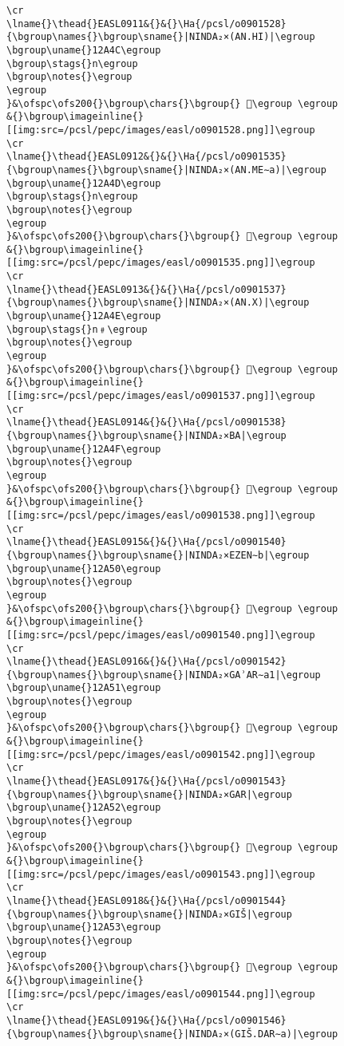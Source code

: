 \begin{verbatim}
\cr
\lname{}\thead{}EASL0911&{}&{}\Ha{/pcsl/o0901528}{\bgroup\names{}\bgroup\sname{}|NINDA₂×(AN.HI)|\egroup
\bgroup\uname{}12A4C\egroup
\bgroup\stags{}n\egroup
\bgroup\notes{}\egroup
\egroup
}&\ofspc\ofs200{}\bgroup\chars{}\bgroup{} 𒩌\egroup \egroup
&{}\bgroup\imageinline{}[[img:src=/pcsl/pepc/images/easl/o0901528.png]]\egroup
\cr
\lname{}\thead{}EASL0912&{}&{}\Ha{/pcsl/o0901535}{\bgroup\names{}\bgroup\sname{}|NINDA₂×(AN.ME∼a)|\egroup
\bgroup\uname{}12A4D\egroup
\bgroup\stags{}n\egroup
\bgroup\notes{}\egroup
\egroup
}&\ofspc\ofs200{}\bgroup\chars{}\bgroup{} 𒩍\egroup \egroup
&{}\bgroup\imageinline{}[[img:src=/pcsl/pepc/images/easl/o0901535.png]]\egroup
\cr
\lname{}\thead{}EASL0913&{}&{}\Ha{/pcsl/o0901537}{\bgroup\names{}\bgroup\sname{}|NINDA₂×(AN.X)|\egroup
\bgroup\uname{}12A4E\egroup
\bgroup\stags{}n﹟\egroup
\bgroup\notes{}\egroup
\egroup
}&\ofspc\ofs200{}\bgroup\chars{}\bgroup{} 𒩎\egroup \egroup
&{}\bgroup\imageinline{}[[img:src=/pcsl/pepc/images/easl/o0901537.png]]\egroup
\cr
\lname{}\thead{}EASL0914&{}&{}\Ha{/pcsl/o0901538}{\bgroup\names{}\bgroup\sname{}|NINDA₂×BA|\egroup
\bgroup\uname{}12A4F\egroup
\bgroup\notes{}\egroup
\egroup
}&\ofspc\ofs200{}\bgroup\chars{}\bgroup{} 𒩏\egroup \egroup
&{}\bgroup\imageinline{}[[img:src=/pcsl/pepc/images/easl/o0901538.png]]\egroup
\cr
\lname{}\thead{}EASL0915&{}&{}\Ha{/pcsl/o0901540}{\bgroup\names{}\bgroup\sname{}|NINDA₂×EZEN∼b|\egroup
\bgroup\uname{}12A50\egroup
\bgroup\notes{}\egroup
\egroup
}&\ofspc\ofs200{}\bgroup\chars{}\bgroup{} 𒩐\egroup \egroup
&{}\bgroup\imageinline{}[[img:src=/pcsl/pepc/images/easl/o0901540.png]]\egroup
\cr
\lname{}\thead{}EASL0916&{}&{}\Ha{/pcsl/o0901542}{\bgroup\names{}\bgroup\sname{}|NINDA₂×GAʾAR∼a1|\egroup
\bgroup\uname{}12A51\egroup
\bgroup\notes{}\egroup
\egroup
}&\ofspc\ofs200{}\bgroup\chars{}\bgroup{} 𒩑\egroup \egroup
&{}\bgroup\imageinline{}[[img:src=/pcsl/pepc/images/easl/o0901542.png]]\egroup
\cr
\lname{}\thead{}EASL0917&{}&{}\Ha{/pcsl/o0901543}{\bgroup\names{}\bgroup\sname{}|NINDA₂×GAR|\egroup
\bgroup\uname{}12A52\egroup
\bgroup\notes{}\egroup
\egroup
}&\ofspc\ofs200{}\bgroup\chars{}\bgroup{} 𒩒\egroup \egroup
&{}\bgroup\imageinline{}[[img:src=/pcsl/pepc/images/easl/o0901543.png]]\egroup
\cr
\lname{}\thead{}EASL0918&{}&{}\Ha{/pcsl/o0901544}{\bgroup\names{}\bgroup\sname{}|NINDA₂×GIŠ|\egroup
\bgroup\uname{}12A53\egroup
\bgroup\notes{}\egroup
\egroup
}&\ofspc\ofs200{}\bgroup\chars{}\bgroup{} 𒩓\egroup \egroup
&{}\bgroup\imageinline{}[[img:src=/pcsl/pepc/images/easl/o0901544.png]]\egroup
\cr
\lname{}\thead{}EASL0919&{}&{}\Ha{/pcsl/o0901546}{\bgroup\names{}\bgroup\sname{}|NINDA₂×(GIŠ.DAR∼a)|\egroup

\end{verbatim}
